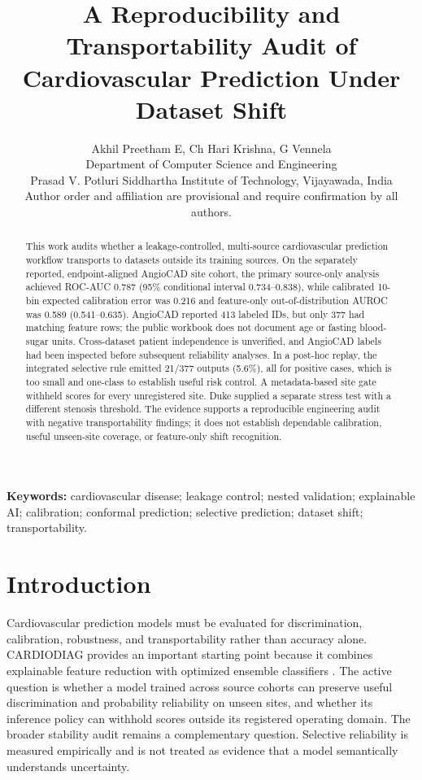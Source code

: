 \documentclass[12pt]{article}
\title{A Reproducibility and Transportability Audit of Cardiovascular Prediction Under Dataset Shift}
\author{Akhil Preetham E, Ch Hari Krishna, G Vennela\par Department of Computer Science and Engineering\par Prasad V. Potluri Siddhartha Institute of Technology, Vijayawada, India\par\small Author order and affiliation are provisional and require confirmation by all authors.}
\begin{document}
\maketitle

\begin{abstract}
This work audits whether a leakage-controlled, multi-source cardiovascular
prediction workflow transports to datasets outside its training sources. On the
separately reported, endpoint-aligned AngioCAD site cohort, the primary
source-only analysis achieved
ROC-AUC 0.787 (95\% conditional interval 0.734--0.838), while calibrated
10-bin expected calibration error was 0.216 and feature-only out-of-distribution
AUROC was 0.589 (0.541--0.635). AngioCAD reported 413 labeled IDs, but only 377
had matching feature rows; the public workbook does not document age or fasting
blood-sugar units. Cross-dataset patient independence is unverified, and
AngioCAD labels had been inspected before subsequent reliability analyses. In
a post-hoc replay, the integrated selective rule emitted
21/377 outputs (5.6\%), all for positive cases, which is too small and
one-class to establish useful risk control. A metadata-based site gate
withheld scores for every unregistered site. Duke supplied a separate stress
test with a different stenosis threshold. The evidence supports a reproducible
engineering audit with negative transportability findings; it does not
establish dependable calibration, useful unseen-site coverage, or feature-only
shift recognition.
\end{abstract}

\noindent\textbf{Keywords:} cardiovascular disease; leakage control; nested validation; explainable AI; calibration; conformal prediction; selective prediction; dataset shift; transportability.

\section{Introduction}
Cardiovascular prediction models must be evaluated for discrimination,
calibration, robustness, and transportability rather than accuracy alone.
CARDIODIAG provides an important starting point because it combines explainable
feature reduction with optimized ensemble classifiers \cite{khan2026cardiodiag}.
The active question is whether a model trained across source cohorts can
preserve useful discrimination and probability reliability on unseen sites,
and whether its inference policy can withhold scores outside its registered
operating domain. The broader stability audit remains a complementary
question. Selective reliability is measured empirically and is not treated as
evidence that a model semantically understands uncertainty.
\end{document}
